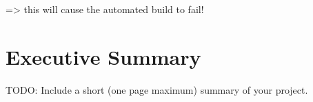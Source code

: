 
\badData => this will cause the automated build to fail!

\chapter{Executive Summary}

TODO: Include a short (one page maximum) summary of your project.
